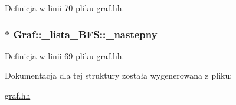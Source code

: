 \-Definicja w linii 70 pliku graf.\-hh.

\hypertarget{struct_graf_1_1__lista___b_f_s_ad101a4841ac1d7c783fc24c4ef6790c1}{
\subsubsection[{\-\_\-nastepny}]{$\ast$ {\bf \-Graf\-::\-\_\-lista\-\_\-\-B\-F\-S\-::\-\_\-nastepny}}}\label{struct_graf_1_1__lista___b_f_s_ad101a4841ac1d7c783fc24c4ef6790c1}


\-Definicja w linii 69 pliku graf.\-hh.



\-Dokumentacja dla tej struktury została wygenerowana z pliku\-:\begin{DoxyCompactItemize}
\item 
\hyperlink{graf_8hh}{graf.\-hh}\end{DoxyCompactItemize}
